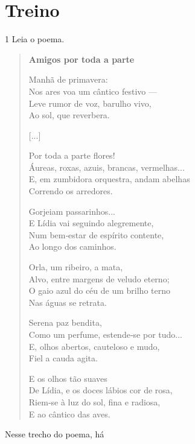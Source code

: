 \section*{Treino}

\num{1} Leia o poema.

\begin{myquote}
\begin{verse}
\textbf{Amigos por toda a parte}

Manhã de primavera:\\
Nos ares voa um cântico festivo ---\\
Leve rumor de voz, barulho vivo,\\
Ao sol, que reverbera.

{[}...{]}

Por toda a parte flores!\\
Áureas, roxas, azuis, brancas, vermelhas...\\
E, em zumbidora orquestra, andam abelhas\\
Correndo os arredores.

Gorjeiam passarinhos...\\
E Lídia vai seguindo alegremente,\\
Num bem‑estar de espírito contente,\\
Ao longo dos caminhos.

Orla, um ribeiro, a mata,\\
Alvo, entre margens de veludo eterno;\\
O gaio azul do céu de um brilho terno\\
Nas águas se retrata.

Serena paz bendita,\\
Como um perfume, estende‑se por tudo...\\
E, olhos abertos, cauteloso e mudo,\\
Fiel a cauda agita.

E os olhos tão suaves\\
De Lídia, e os doces lábios cor de rosa,\\
Riem‑se à luz do sol, fina e radiosa,\\
E ao cântico das aves.
\end{verse}


\end{myquote}

Nesse trecho do poema, há

